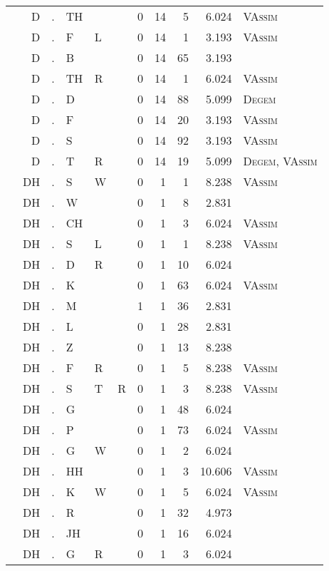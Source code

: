 \begin{longtable}{r@{ } r@{ } c@{ } l@{ } l@{ } l@{ } r r r r l }
 & D & . & TH &  &  & 0 & 14 & 5 & 6.024 & \textsc{VAssim} \\
 & D & . & F & L &  & 0 & 14 & 1 & 3.193 & \textsc{VAssim} \\
 & D & . & B &  &  & 0 & 14 & 65 & 3.193 &  \\
 & D & . & TH & R &  & 0 & 14 & 1 & 6.024 & \textsc{VAssim} \\
 & D & . & D &  &  & 0 & 14 & 88 & 5.099 & \textsc{Degem} \\
 & D & . & F &  &  & 0 & 14 & 20 & 3.193 & \textsc{VAssim} \\
 & D & . & S &  &  & 0 & 14 & 92 & 3.193 & \textsc{VAssim} \\
 & D & . & T & R &  & 0 & 14 & 19 & 5.099 & \textsc{Degem}, \textsc{VAssim} \\
 & DH & . & S & W &  & 0 & 1 & 1 & 8.238 & \textsc{VAssim} \\
 & DH & . & W &  &  & 0 & 1 & 8 & 2.831 &  \\
 & DH & . & CH &  &  & 0 & 1 & 3 & 6.024 & \textsc{VAssim} \\
 & DH & . & S & L &  & 0 & 1 & 1 & 8.238 & \textsc{VAssim} \\
 & DH & . & D & R &  & 0 & 1 & 10 & 6.024 &  \\
 & DH & . & K &  &  & 0 & 1 & 63 & 6.024 & \textsc{VAssim} \\
 & DH & . & M &  &  & 1 & 1 & 36 & 2.831 &  \\
 & DH & . & L &  &  & 0 & 1 & 28 & 2.831 &  \\
 & DH & . & Z &  &  & 0 & 1 & 13 & 8.238 &  \\
 & DH & . & F & R &  & 0 & 1 & 5 & 8.238 & \textsc{VAssim} \\
 & DH & . & S & T & R & 0 & 1 & 3 & 8.238 & \textsc{VAssim} \\
 & DH & . & G &  &  & 0 & 1 & 48 & 6.024 &  \\
 & DH & . & P &  &  & 0 & 1 & 73 & 6.024 & \textsc{VAssim} \\
 & DH & . & G & W &  & 0 & 1 & 2 & 6.024 &  \\
 & DH & . & HH &  &  & 0 & 1 & 3 & 10.606 & \textsc{VAssim} \\
 & DH & . & K & W &  & 0 & 1 & 5 & 6.024 & \textsc{VAssim} \\
 & DH & . & R &  &  & 0 & 1 & 32 & 4.973 &  \\
 & DH & . & JH &  &  & 0 & 1 & 16 & 6.024 &  \\
 & DH & . & G & R &  & 0 & 1 & 3 & 6.024 &  \\

\end{longtable}
